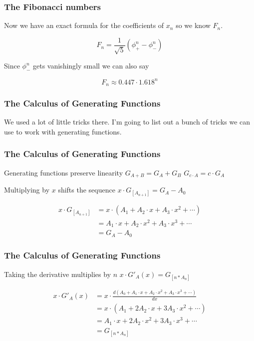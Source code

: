 \documentclass{beamer}
\begin{document}
\begin{frame}
    \frametitle{The Fibonacci numbers}

    Now we have an exact formula for the coefficients of $x_n$ so we know $F_n$.

    $$F_n = \frac{1}{\sqrt{5}} \left( \phi_+^n - \phi_-^n\right)$$ \pause

    Since $\phi_-^n$ gets vanishingly small we can also say

    $$F_n \approx 0.447 \cdot 1.618^n$$


\end{frame}

\begin{frame}
    \frametitle{The Calculus of Generating Functions}

    We used a lot of little tricks there. I'm going to list out a bunch of tricks we can use to work with generating functions.

\end{frame}

\begin{frame}
    \frametitle{The Calculus of Generating Functions}

    \begin{block}{Generating functions preserve linearity}
        $G_{A + B} = G_A + G_B$ \newline
        $G_{c \cdot A} = c \cdot G_A$ 
    \end{block}

    \pause

    \begin{block}{Multiplying by $x$ shifts the sequence}
        $x \cdot G_{[A_{n+1}]} = G_A - A_0$
    \end{block}

    \begin{align*}
        x \cdot G_{[A_{n+1}]} &= x \cdot (A_1 + A_2 \cdot x + A_3 \cdot x^2 + \cdots) \\
        &= A_1 \cdot x + A_2 \cdot x^2 + A_3 \cdot x^3 + \cdots \\
        &= G_A - A_0
    \end{align*}

\end{frame}

\begin{frame}
    \frametitle{The Calculus of Generating Functions}

    \begin{block}{Taking the derivative multiplies by $n$}
        $x \cdot G'_A(x) = G_{[n*A_n]}$
    \end{block}

    \begin{align*}
        x \cdot G'_A(x) &= x \cdot \frac{d(A_0 + A_1 \cdot x + A_2 \cdot x^2 + A_3 \cdot x^3 + \cdots )}{dx} \\
        &= x \cdot (A_1 + 2A_2 \cdot x + 3A_3 \cdot x^2 + \cdots ) \\
        &= A_1 \cdot x + 2A_2 \cdot x^2 + 3A_3 \cdot x^3 + \cdots \\
        &= G_{[n*A_n]}
    \end{align*}

\end{frame}
\end{document}
